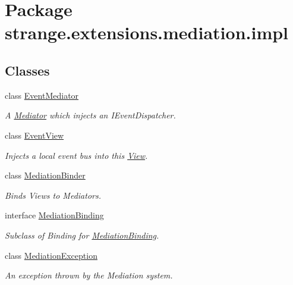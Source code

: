 \hypertarget{namespacestrange_1_1extensions_1_1mediation_1_1impl}{\section{Package strange.\-extensions.\-mediation.\-impl}
\label{namespacestrange_1_1extensions_1_1mediation_1_1impl}
}
\subsection*{Classes}
\begin{DoxyCompactItemize}
\item 
class \hyperlink{classstrange_1_1extensions_1_1mediation_1_1impl_1_1_event_mediator}{Event\-Mediator}
\begin{DoxyCompactList}\small\item\em A \hyperlink{classstrange_1_1extensions_1_1mediation_1_1impl_1_1_mediator}{Mediator} which injects an I\-Event\-Dispatcher. \end{DoxyCompactList}\item 
class \hyperlink{classstrange_1_1extensions_1_1mediation_1_1impl_1_1_event_view}{Event\-View}
\begin{DoxyCompactList}\small\item\em Injects a local event bus into this \hyperlink{classstrange_1_1extensions_1_1mediation_1_1impl_1_1_view}{View}. \end{DoxyCompactList}\item 
class \hyperlink{classstrange_1_1extensions_1_1mediation_1_1impl_1_1_mediation_binder}{Mediation\-Binder}
\begin{DoxyCompactList}\small\item\em Binds Views to Mediators. \end{DoxyCompactList}\item 
interface \hyperlink{classstrange_1_1extensions_1_1mediation_1_1impl_1_1_mediation_binding}{Mediation\-Binding}
\begin{DoxyCompactList}\small\item\em Subclass of Binding for \hyperlink{classstrange_1_1extensions_1_1mediation_1_1impl_1_1_mediation_binding}{Mediation\-Binding}. \end{DoxyCompactList}\item 
class \hyperlink{classstrange_1_1extensions_1_1mediation_1_1impl_1_1_mediation_exception}{Mediation\-Exception}
\begin{DoxyCompactList}\small\item\em An exception thrown by the Mediation system. \end{DoxyCompactList}\item 

\end{DoxyCompactItemize}
